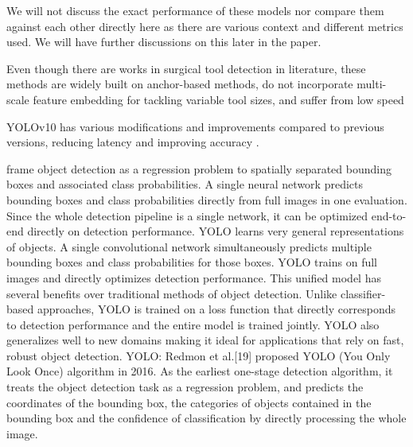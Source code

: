 We will not discuss the exact performance of these models nor compare them against each other directly here as there are various context and different metrics used. We will have further discussions on this later in the paper.

Even though there are works in surgical tool detection in literature, these methods are widely built on anchor-based methods, do not incorporate multi-scale feature embedding for tackling variable tool sizes, and suffer from low speed


YOLOv10 has various modifications and improvements compared to previous versions, reducing latency and improving accuracy \cite{ultralytics_yolov10_2024}. 

frame object detection as a regression problem to spatially separated bounding boxes and associated class probabilities. A single neural network predicts bounding boxes and class probabilities directly from full images in one evaluation. Since the whole detection pipeline is a single network, it can be optimized end-to-end directly on detection performance. YOLO learns very general representations of objects. A single convolutional network simultaneously predicts multiple bounding boxes and class probabilities for those boxes. YOLO trains on full images and directly optimizes detection performance. This unified model has several benefits over traditional methods of object detection. Unlike classifier-based approaches, YOLO is trained on a loss function that directly corresponds to detection performance and the entire model is trained jointly. YOLO also generalizes well to new domains making it ideal for applications that rely on fast, robust object detection. 
YOLO: Redmon et al.[19] proposed YOLO (You Only Look Once) algorithm in 2016. As the earliest one-stage detection algorithm, it treats the object detection task as a regression problem, and predicts the coordinates of the bounding box, the categories of objects contained in the bounding box and the confidence of classification by directly processing the whole image. 

